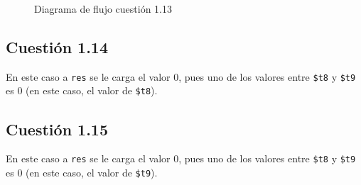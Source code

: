 \documentclass[11pt]{article}
\begin{document}
\begin{large}
\begin{flushleft}
\begin{figure}[H]
    \centering
    \caption{Diagrama de flujo cuestión 1.13}
    \label{fig:my_label}
\end{figure}



\subsection*{Cuestión 1.14}
En este caso a \texttt{res} se le carga el valor 0, pues uno de los valores entre \texttt{\$t8} y \texttt{\$t9} es 0 (en este caso, el valor de \texttt{\$t8}).




\subsection*{Cuestión 1.15}
En este caso a \texttt{res} se le carga el valor 0, pues uno de los valores entre \texttt{\$t8} y \texttt{\$t9} es 0 (en este caso, el valor de \texttt{\$t9}).


\end{flushleft}
\end{large}
\end{document}

